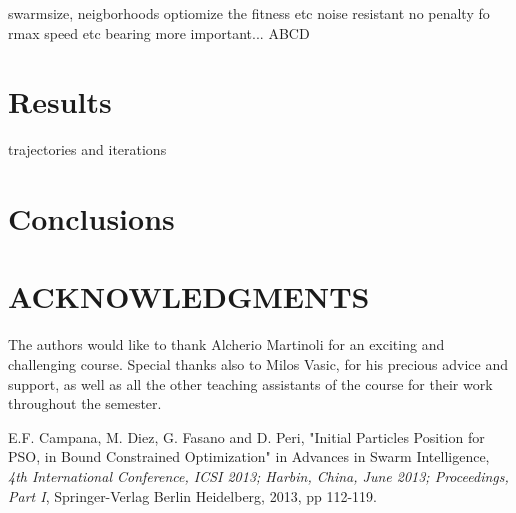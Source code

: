 \documentclass[a4, 10 pt, conference]{ieeeconf}  %
\begin{document}
swarmsize, neigborhoods
optiomize the fitness etc noise resistant
no penalty fo rmax speed etc
bearing more important... ABCD

\section{Results}
trajectories and iterations
\section{Conclusions}

\section{ACKNOWLEDGMENTS}
The authors would like to thank Alcherio Martinoli for an exciting and challenging course. Special thanks also to Milos Vasic, for his precious advice and support, as well as all the other teaching assistants of the course for their work throughout the semester.

\begin{thebibliography}{99}

E.F. Campana, M. Diez, G. Fasano and D. Peri, "Initial Particles Position for PSO,
in Bound Constrained Optimization" in Advances in Swarm Intelligence, {\it 4th International Conference, ICSI 2013; Harbin, China, June 2013; Proceedings, Part I}, Springer-Verlag Berlin Heidelberg, 2013, pp 112-119.

\end{thebibliography}
\end{document}

